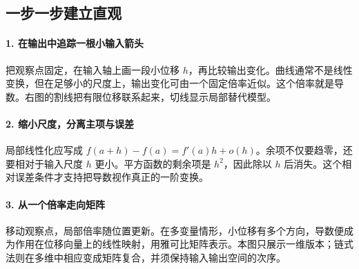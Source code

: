 \subsection*{一步一步建立直观}

\paragraph{1. 在输出中追踪一根小输入箭头}

把观察点固定，在输入轴上画一段小位移 $h$，再比较输出变化。曲线通常不是线性变换，但在足够小的尺度上，输出变化可由一个固定倍率近似。这个倍率就是导数。右图的割线把有限位移联系起来，切线显示局部替代模型。



\paragraph{2. 缩小尺度，分离主项与误差}

局部线性化应写成 $f(a+h)-f(a)=f'(a)h+o(h)$。余项不仅要趋零，还要相对于输入尺度 $h$ 更小。平方函数的剩余项是 $h^2$，因此除以 $h$ 后消失。这个相对误差条件才支持把导数视作真正的一阶变换。



\paragraph{3. 从一个倍率走向矩阵}

移动观察点，局部倍率随位置更新。在多变量情形，小位移有多个方向，导数便成为作用在位移向量上的线性映射，用雅可比矩阵表示。本图只展示一维版本；链式法则在多维中相应变成矩阵复合，并须保持输入输出空间的次序。
